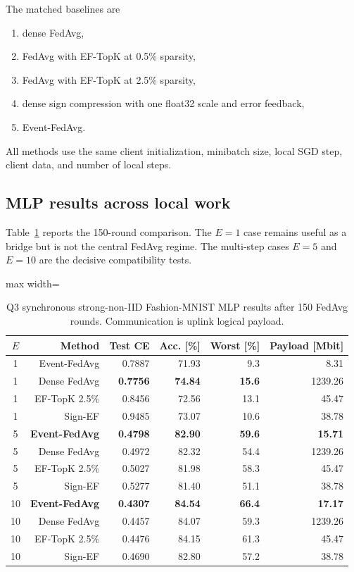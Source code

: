 The matched baselines are
\begin{enumerate}
    \item dense FedAvg,
    \item FedAvg with EF-TopK at 0.5\% sparsity,
    \item FedAvg with EF-TopK at 2.5\% sparsity,
    \item dense sign compression with one float32 scale and error feedback,
    \item Event-FedAvg.
\end{enumerate}
All methods use the same client initialization, minibatch size, local SGD step, client data, and number of local steps.

\subsection{MLP results across local work}

Table~\ref{tab:q3-mlp-main} reports the 150-round comparison. The $E=1$ case remains useful as a bridge but is not the central FedAvg regime. The multi-step cases $E=5$ and $E=10$ are the decisive compatibility tests.

\begin{table}[ht]
\centering
\small
\caption{Q3 synchronous strong-non-IID Fashion-MNIST MLP results after 150 FedAvg rounds. Communication is uplink logical payload.}
\label{tab:q3-mlp-main}
\begin{adjustbox}{max width=\textwidth}
\begin{tabular}{crrrrr}
\toprule
$E$ & Method & Test CE & Acc. [\%] & Worst [\%] & Payload [Mbit]\\
\midrule
1 & Event-FedAvg & 0.7887 & 71.93 & 9.3 & 8.31\\
1 & Dense FedAvg & \textbf{0.7756} & \textbf{74.84} & \textbf{15.6} & 1239.26\\
1 & EF-TopK 2.5\% & 0.8456 & 72.56 & 13.1 & 45.47\\
1 & Sign-EF & 0.9485 & 73.07 & 10.6 & 38.78\\
\midrule
5 & \textbf{Event-FedAvg} & \textbf{0.4798} & \textbf{82.90} & \textbf{59.6} & \textbf{15.71}\\
5 & Dense FedAvg & 0.4972 & 82.32 & 54.4 & 1239.26\\
5 & EF-TopK 2.5\% & 0.5027 & 81.98 & 58.3 & 45.47\\
5 & Sign-EF & 0.5277 & 81.40 & 51.1 & 38.78\\
\midrule
10 & \textbf{Event-FedAvg} & \textbf{0.4307} & \textbf{84.54} & \textbf{66.4} & \textbf{17.17}\\
10 & Dense FedAvg & 0.4457 & 84.07 & 59.3 & 1239.26\\
10 & EF-TopK 2.5\% & 0.4476 & 84.15 & 61.3 & 45.47\\
10 & Sign-EF & 0.4690 & 82.80 & 57.2 & 38.78\\
\bottomrule
\end{tabular}
\end{adjustbox}
\end{table}

